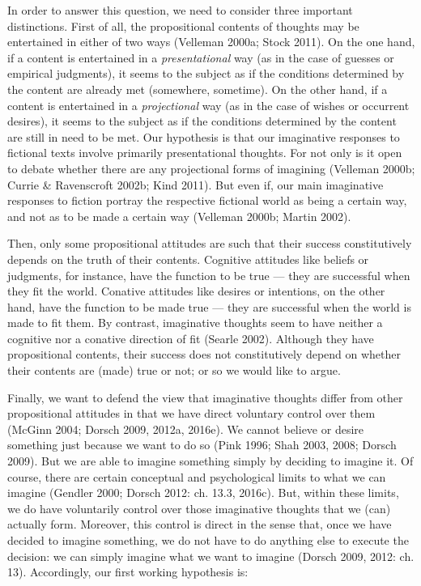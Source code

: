 \noindent In order to answer this question, we need to consider three important distinctions. First of all, the propositional contents of thoughts may be entertained in either of two ways (Velleman 2000a; Stock 2011). On the one hand, if a content is entertained in a \emph{presentational} way (as in the case of guesses or empirical judgments), it seems to the subject as if the conditions determined by the content are already met (somewhere, sometime). On the other hand, if a content is entertained in a \emph{projectional} way (as in the case of wishes or occurrent desires), it seems to the subject as if the conditions determined by the content are still in need to be met. Our hypothesis is that our imaginative responses to fictional texts involve primarily presentational thoughts. For not only is it open to debate whether there are any projectional forms of imagining (Velleman 2000b; Currie \& Ravenscroft 2002b; Kind 2011). But even if, our main imaginative responses to fiction portray the respective fictional world as being a certain way, and not as to be made a certain way (Velleman 2000b; Martin 2002).

Then, only some propositional attitudes are such that their success constitutively depends on the truth of their contents. Cognitive attitudes like beliefs or judgments, for instance, have the function to be true --- they are successful when they fit the world. Conative attitudes like desires or intentions, on the other hand, have the function to be made true --- they are successful when the world is made to fit them. By contrast, imaginative thoughts seem to have neither a cognitive nor a conative direction of fit (Searle 2002). Although they have propositional contents, their success does not constitutively depend on whether their contents are (made) true or not; or so we would like to argue.

Finally, we want to defend the view that imaginative thoughts differ from other propositional attitudes in that we have direct voluntary control over them (McGinn 2004; Dorsch 2009, 2012a, 2016e). We cannot believe or desire something just because we want to do so (Pink 1996; Shah 2003, 2008; Dorsch 2009). But we are able to imagine something simply by deciding to imagine it. Of course, there are certain conceptual and psychological limits to what we can imagine (Gendler 2000; Dorsch 2012: ch. 13.3, 2016c). But, within these limits, we do have voluntarily control over those imaginative thoughts that we (can) actually form. Moreover, this control is direct in the sense that, once we have decided to imagine something, we do not have to do anything else to execute the decision: we can simply imagine what we want to imagine (Dorsch 2009, 2012: ch. 13). Accordingly, our first working hypothesis is:

